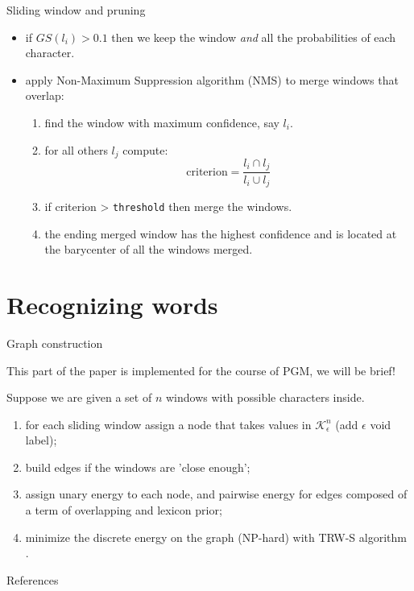 \documentclass[handout]{beamer}
\begin{document}
\begin{frame}{Sliding window and pruning}
\begin{itemize}
	\item if $GS(l_i) > 0.1$ then we keep the window \emph{and} all the probabilities of each character.
	\item apply Non-Maximum Suppression algorithm (NMS) to merge windows that overlap:
	\begin{enumerate}
		\item find the window with maximum confidence, say $l_i$.
		\item for all others $l_j$ compute:
		\begin{equation}
		\text{criterion} = \frac{l_i \cap l_j}{l_i \cup l_j}
		\label{eq:}
		\end{equation}
		\item if criterion > \texttt{threshold} then merge the windows.
		\item the ending merged window has the highest confidence and is located at the barycenter of all the windows merged.
	\end{enumerate}
\end{itemize}
\end{frame}


\section{Recognizing words}


\begin{frame}{Graph construction}
\begin{alertblock}{}
This part of the paper is implemented for the course of PGM, we will be brief!
\end{alertblock}
Suppose we are given a set of $n$ windows with possible characters inside.
\begin{enumerate}
	\item for each sliding window assign a node that takes values in $\mathcal{K}_{\epsilon}^n$ (add $\epsilon$ void label);
	\item build edges if the windows are 'close enough';
	\item assign unary energy to each node, and pairwise energy for edges composed of a term of overlapping and lexicon prior;
	\item minimize the discrete energy on the graph (NP-hard) with TRW-S algorithm \cite{Kol}.
\end{enumerate}

\end{frame}











\begin{frame}{References}
\tiny


\end{frame}
\end{document}
